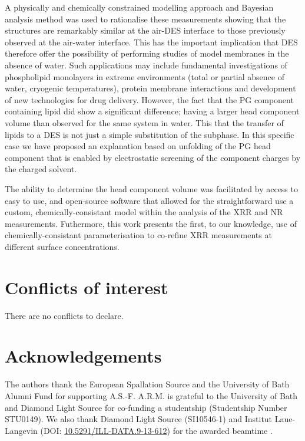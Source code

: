 \documentclass[twoside,twocolumn,9pt]{article}
\renewcommand{\refname}{Notes and references}
\begin{document}
A physically and chemically constrained modelling approach and Bayesian analysis method was used to rationalise these measurements showing that the structures are remarkably similar at the air-DES interface to those previously observed at the air-water interface. This has the important implication that DES therefore offer the possibility of performing studies of model membranes in the absence of water. Such applications may include fundamental investigations of phospholipid monolayers in extreme environments (total or partial absence of water, cryogenic temperatures), protein membrane interactions and development of new technologies for drug delivery. However, the fact that the PG component containing lipid did show a significant difference; having a larger head component volume than observed for the same system in water. This that the transfer of lipids to a DES is not just a simple substitution of the subphase. In this specific case we have proposed an explanation based on unfolding of the PG head component that is enabled by electrostatic screening of the component charges by the charged solvent.

The ability to determine the head component volume was facilitated by access to easy to use, and open-source software that allowed for the straightforward use a custom, chemically-consistant model within the analysis of the XRR and NR measurements. Futhermore, this work presents the first, to our knowledge, use of chemically-consistant parameterisation to co-refine XRR measurements at different surface concentrations.

\section*{Conflicts of interest}
There are no conflicts to declare.

\section*{Acknowledgements}
The authors thank the European Spallation Source and the University of Bath Alumni Fund for supporting A.S.-F. A.R.M. is grateful to the University of Bath and Diamond Light Source for co-funding a studentship (Studentship Number STU0149). We also thank Diamond Light Source (SI10546-1) and Institut Laue-Langevin (DOI: \href{http://doi.org/10.5291/ILL-DATA.9-13-612}{10.5291/ILL-DATA.9-13-612}) for the awarded beamtime .



\balance


\end{document}
